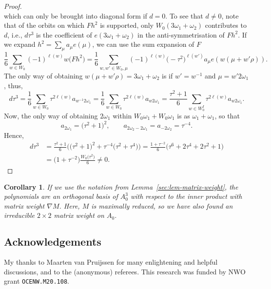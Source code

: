 \documentclass[10pt,a4paper]{amsart}
\newtheorem{Corollary}[Theorem]{Corollary}
\theoremstyle{definition}
\numberwithin{equation}{section}
\begin{document}
\begin{proof}
\[ \]
 which can only be brought into diagonal form if $d=0$. To see that $d\ne0$,
 note that of the orbits on which $Fh^2$ is supported, only $W_0(3\omega_1+\omega_2)$ contributes to $d$, i.e., $d\tau^3$ is the coefficient of $e(3\omega_1+\omega_2)$ in the anti-symmetrisation of $Fh^2$. If we expand
$
 h^2 = \sum_\mu a_\mu e(\mu)$,
 we can use the sum expansion of $F$
 \[
 \frac{1}{6}\sum_{w\in W_0} (-1)^{\ell(w)} w\bigl(Fh^2\bigr)
 = \frac{1}{6}\sum_{w,w'\in W_0,\mu} (-1)^{\ell(w)} \bigl(-\tau^2\bigr)^{\ell(w')}
 a_\mu e(w(\mu + w'\rho)).
 \]
 The only way of obtaining $w(\mu + w'\rho)=3\omega_1+\omega_2$ is if
 $w'=w^{-1}$ and $\mu=w'2\omega_1$, thus,
 \[
 d\tau^3 = \frac{1}{6}\sum_{w\in W_0} \tau^{2\ell(w)}
 a_{w^{-1}2\omega_1}
 = \frac{1}{6}\sum_{w\in W_0} \tau^{2\ell(w)} a_{w2\omega_1}
 = \frac{\tau^2+1}{6}\sum_{w\in W_0^I} \tau^{2\ell(w)} a_{w2\omega_1}.
 \]
 Now, the only way of obtaining $2\omega_1$ within $W_0\omega_1+W_0\omega_1$
 is as $\omega_1+\omega_1$, so that
 \[
 a_{2\omega_1} = \bigl(\tau^2+1\bigr)^2,\qquad
 a_{2\omega_2-2\omega_1} = a_{-2\omega_2} = \tau^{-4}.
 \]
 Hence,
 \begin{align*}
 d\tau^3 &= \frac{\tau^2+1}{6}\bigl(\bigl(\tau^2+1\bigr)^2 + \tau^{-4}\bigl(\tau^2+\tau^4\bigr)\bigr)
 = \frac{1+\tau^{-2}}{6} \bigl(\tau^6 + 2\tau^4 + 2\tau^2 + 1\bigr)\\
 &= \bigl(1+\tau^{-2}\bigr)\frac{W_0\bigl(\tau^2\bigr)}{6}\ne0.\tag*{\qed}
 \end{align*} \renewcommand{\qed}{}
\end{proof}

\begin{Corollary}
 If we use the notation from Lemma~{\rm\ref{sec:lem-matrix-weight}}, the polynomials
  are an orthogonal basis of
 $A_0^3$ with respect to the inner product with matrix weight $\nabla M$.
 Here, $M$ is maximally reduced, so we have also found an irreducible $2\times 2$ matrix weight
 on $A_0$.
\end{Corollary}

\subsection*{Acknowledgements}
My thanks to Maarten van Pruijssen for many enlightening and helpful discussions, and to the (anonymous) referees. This research was funded by NWO grant \texttt{OCENW.M20.108}.

\end{document}
